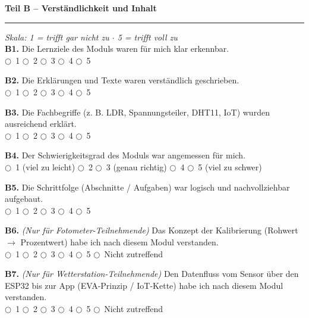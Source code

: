 \documentclass[a4paper,10pt]{article}
\newcommand{\radio}{\textsf{\Large$\bigcirc$}}
\begin{document}
\vspace{10pt}

{\large \bfseries \color{primary} Teil B – Verständlichkeit und Inhalt}\\[-4pt]
\color{accent}\rule{\linewidth}{1.5pt}\color{black}\vspace{2pt}
{\small\itshape Skala: 1 = trifft gar nicht zu $\cdot$ 5 = trifft voll zu}\\[4pt]

\textbf{B1.} Die Lernziele des Moduls waren für mich klar erkennbar.\\
\radio~1 \quad \radio~2 \quad \radio~3 \quad \radio~4 \quad \radio~5

\vspace{5pt}
\textbf{B2.} Die Erklärungen und Texte waren verständlich geschrieben.\\
\radio~1 \quad \radio~2 \quad \radio~3 \quad \radio~4 \quad \radio~5

\vspace{5pt}
\textbf{B3.} Die Fachbegriffe (z. B. LDR, Spannungsteiler, DHT11, IoT) wurden ausreichend erklärt.\\
\radio~1 \quad \radio~2 \quad \radio~3 \quad \radio~4 \quad \radio~5

\vspace{5pt}
\textbf{B4.} Der Schwierigkeitsgrad des Moduls war angemessen für mich.\\
\radio~1 (viel zu leicht) \quad \radio~2 \quad \radio~3 (genau richtig) \quad \radio~4 \quad \radio~5 (viel zu schwer)

\vspace{5pt}
\textbf{B5.} Die Schrittfolge (Abschnitte / Aufgaben) war logisch und nachvollziehbar aufgebaut.\\
\radio~1 \quad \radio~2 \quad \radio~3 \quad \radio~4 \quad \radio~5

\vspace{5pt}
\textbf{B6.} \textit{(Nur für Fotometer-Teilnehmende)} Das Konzept der Kalibrierung (Rohwert $\rightarrow$ Prozentwert) habe ich nach diesem Modul verstanden.\\
\radio~1 \quad \radio~2 \quad \radio~3 \quad \radio~4 \quad \radio~5 \quad \radio~Nicht zutreffend

\vspace{5pt}
\textbf{B7.} \textit{(Nur für Wetterstation-Teilnehmende)} Den Datenfluss vom Sensor über den ESP32 bis zur App (EVA-Prinzip / IoT-Kette) habe ich nach diesem Modul verstanden.\\
\radio~1 \quad \radio~2 \quad \radio~3 \quad \radio~4 \quad \radio~5 \quad \radio~Nicht zutreffend
\end{document}
